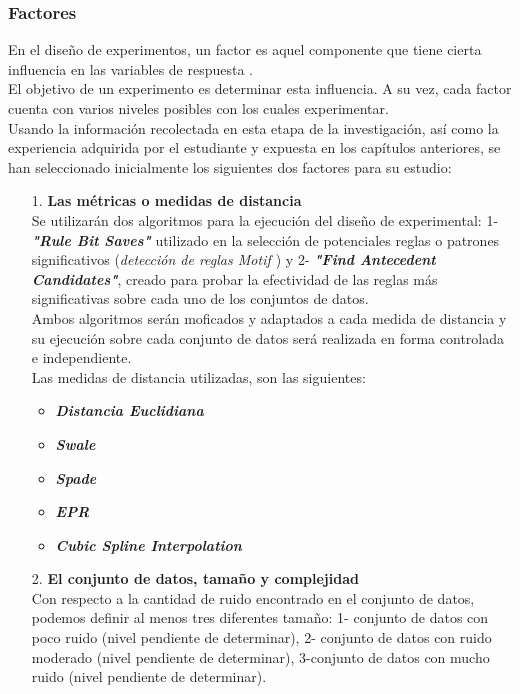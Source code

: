 \subsubsection{Factores}
En el dise\~no de experimentos, un factor es aquel componente que tiene cierta
influencia en las variables de respuesta \cite{montgomeryx}.\\
El objetivo de un experimento es determinar esta influencia. A su vez, cada factor cuenta con varios niveles posibles con los cuales experimentar.\\
Usando la informaci\'on recolectada en esta etapa de la investigaci\'on, as\'i como la experiencia adquirida por el estudiante y expuesta en los cap\'itulos anteriores, se han seleccionado inicialmente los siguientes dos factores para su estudio:
\begin{itemize}
\item [1.] \textbf{Las m\'etricas o medidas de distancia}\\
Se utilizar\'an dos algoritmos para la ejecuci\'on del dise\~no de experimental: 1- \textit{\textbf{"Rule Bit Saves"}} utilizado en la selecci\'on de potenciales reglas o patrones significativos (\textit{\textit{detecci\'on de reglas \textit{Motif \cite{main}}}}) y 2- \textit{\textbf{"Find Antecedent Candidates"}}, creado para probar la efectividad de las reglas m\'as significativas sobre cada uno de los conjuntos de datos.\\
Ambos algoritmos ser\'an moficados y adaptados a cada medida de distancia y su ejecuci\'on sobre cada conjunto de datos ser\'a realizada en forma controlada e independiente.\\
Las medidas de distancia utilizadas, son las siguientes:
\begin{itemize}
\item \textbf{\textit{Distancia Euclidiana}}
\item \textbf{\textit{Swale}}
\item \textbf{\textit{Spade}}
\item \textbf{\textit{EPR}}
\item \textbf{\textit{Cubic Spline Interpolation}}
\end{itemize}
\item [2.] \textbf{El conjunto de datos, tama\~no y complejidad}\\
Con respecto a la cantidad de ruido encontrado en el conjunto de datos, podemos definir al menos tres diferentes tama\~no: 1- conjunto de datos con poco ruido (nivel pendiente de determinar), 2- conjunto de datos con ruido moderado (nivel pendiente de determinar), 3-conjunto de datos con mucho ruido (nivel pendiente de determinar). \\

\end{itemize}
